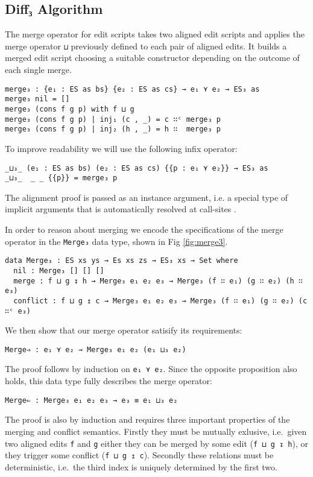\documentclass[preprint]{sigplanconf}
\theoremstyle{plain}
\begin{document}
        \subsection{Diff₃ Algorithm}
        \label{subsec:diff3-algo}

	The merge operator for edit scripts takes two aligned edit scripts and
	applies the merge operator \texttt{⊔} previously defined to
	each pair of aligned edits. It builds a merged edit script choosing a 
	suitable constructor depending on the outcome of each single merge.

\begin{verbatim}
merge₃ : {e₁ : ES as bs} {e₂ : ES as cs} → e₁ ⋎ e₂ → ES₃ as
merge₃ nil = []
merge₃ (cons f g p) with f ⊔ g
merge₃ (cons f g p) | inj₁ (c , _) = c ∷ᶜ merge₃ p
merge₃ (cons f g p) | inj₂ (h , _) = h ∷  merge₃ p
\end{verbatim}
	To improve readability we will use the following infix
        operator:
\begin{verbatim}
_⊔₃_ (e₁ : ES as bs) (e₂ : ES as cs) {{p : e₁ ⋎ e₂}} → ES₃ as
_⊔₃_  _ _ {{p}} = merge₃ p
\end{verbatim}
	The alignment proof is passed  as an instance argument, i.e. a
        special  type  of  implicit arguments  that  is  automatically
        resolved at call-sites \cite{Devriese11}.

        In order to reason about merging we encode the specifications
        of the merge operator in the \texttt{Merge₃} data type, shown
        in Fig \ref{fig:merge3}.

\begin{figure*}[t!]
\centering
\begin{verbatim}
data Merge₃ : ES xs ys → Es xs zs → ES₃ xs → Set where
  nil : Merge₃ [] [] []
  merge : f ⊔ g ↧ h → Merge₃ e₁ e₂ e₃ → Merge₃ (f ∷ e₁) (g ∷ e₂) (h ∷ e₃)
  conflict : f ⊔ g ↥ c → Merge₃ e₁ e₂ e₃ → Merge₃ (f ∷ e₁) (g ∷ e₂) (c ∷ᶜ e₃)
\end{verbatim}
\caption{Merge operator specification}
\label{fig:merge3}
\end{figure*}

        We then show that our merge operator satisify its requirements:
\begin{verbatim}
Merge⇒ : e₁ ⋎ e₂ → Merge₃ e₁ e₂ (e₁ ⊔₃ e₂)
\end{verbatim}
        The proof follows by induction on \texttt{e₁ ⋎ e₂}. Since the opposite
        proposition also holds, this data type fully describes the merge operator:
\begin{verbatim}
Merge⇐ : Merge₃ e₁ e₂ e₃ → e₃ ≡ e₁ ⊔₃ e₂
\end{verbatim}
        The proof is also by induction and requires three important
        properties of the merging and conflict semantics.
        Firstly they must be mutually exlusive, i.e.\ given two
        aligned edits \texttt{f} and \texttt{g} either they can be
        merged by some edit (\texttt{f ⊔ g ↧ h}), or they trigger some
        conflict (\texttt{f ⊔ g ↥ c}). Secondly these relations must
        be deterministic, i.e.\ the third index is uniquely determined
        by the first two.
        
\end{document}
